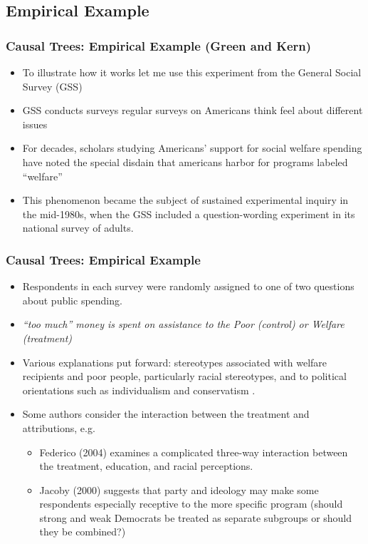 \documentclass[
  shownotes,
  xcolor={svgnames},
  hyperref={colorlinks,citecolor=DarkBlue,linkcolor=DarkRed,urlcolor=DarkBlue}
  , aspectratio=169]{beamer}
\begin{document}
\subsection{Empirical Example}
\begin{frame}[fragile]
\frametitle{Causal Trees: Empirical Example (Green and Kern) }

\begin{itemize}
\item To illustrate how it works let me use this experiment from the General Social Survey (GSS)
\medskip
\item GSS conducts surveys regular surveys on Americans think feel about different issues
\medskip
 \item For decades, scholars studying Americans' support for social welfare spending have noted the special disdain that americans harbor for programs labeled “welfare” 
\medskip
 \item This phenomenon became the subject of sustained experimental inquiry in the mid-1980s, when the GSS included a question-wording experiment in its national survey of adults. 
 \medskip

\end{itemize}
\end{frame}
\begin{frame}[fragile]
\frametitle{Causal Trees: Empirical Example }
\begin{itemize}
\item Respondents in each survey were randomly assigned to one of two questions about public spending.
 \medskip
\item {\it “too much” money is spent on assistance to the Poor (control) or Welfare (treatment)}
\medskip
\item Various explanations put forward: stereotypes  associated  with  welfare  recipients  and  poor  people, particularly racial stereotypes,  and  to  political  orientations  such  as  individualism  and  conservatism  .  
\item Some authors consider the  interaction  between  the  treatment  and  attributions,  e.g.
\begin{itemize}
 \item Federico  (2004)  examines  a  complicated  three-way  interaction  between  the  treatment,  education,  and  racial  perceptions.  
 \item Jacoby  (2000)  suggests  that  party  and  ideology  may make some respondents especially receptive to the more specific program (should strong and weak Democrats be treated as separate subgroups or should they be combined?)
\end{itemize}
\end{itemize}
\end{frame}
\end{document}
